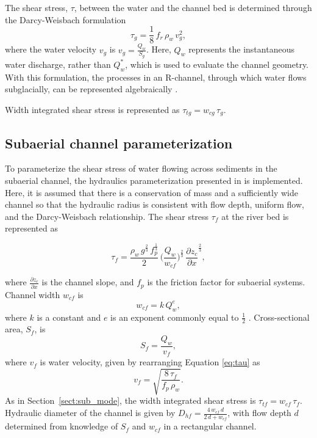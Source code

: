 \documentclass[draft]{agujournal2019}
\begin{document}
  The shear stress, $\tau$, between the water and the channel bed is determined through the Darcy-Weisbach formulation
  \begin{equation}
    \label{eq:tau}
    \tau_g=\frac{1}{8}\,f_r\,\rho_w\,v_g^2,
  \end{equation}
  where  the water velocity $v_g$ is $v_g = \frac{Q_w}{S_g}$.
  Here, $Q_w$ represents the instantaneous water discharge, rather than $Q_w^*$, which is used to evaluate the channel geometry.
  With this formulation, the processes in an R-channel, through which water flows subglacially, can be represented algebraically \cite{rothlisberger1972,delaney2019}.
  
    Width integrated shear stress is represented as $\tau_{tg}=w_{cg}\,\tau_g $.
  
  \subsection{Subaerial channel  parameterization}
  \label{sect:fluv}
  
  To parameterize the shear stress of water flowing across sediments in the subaerial channel,  the hydraulics parameterization presented in  is implemented.
  Here, it is assumed that there is a conservation of mass and a sufficiently wide channel so that the hydraulic radius is consistent with flow depth, uniform flow, and the Darcy-Weisbach relationship.
  The shear stress $\tau_f$ at the river bed is represented as
  \begin{linenomath*}
    \begin{equation}
      \label{eq:DW_tau}
      \tau_f=\frac{\rho_w\,g^{\frac{2}{3}}\,f_p^{\frac{1}{3}}}{2}\, \Big(\frac{Q_w}{w_{cf}} \Big)^{\frac{2}{3}} \,\frac{\partial z_c}{\partial x}^{\frac{2}{3}},
    \end{equation}
  \end{linenomath*}
  where $\frac{\partial z_c}{\partial x}$ is the channel slope, and $f_p$ is the friction factor for subaerial systems.
  Channel width $w_{cf}$ is 
  \begin{equation}
    \label{eq:wcf}
    w_{cf} = k \, Q_w^e,
  \end{equation}
  where $k$ is a constant and $e$ is an exponent commonly equal to $\frac{1}{2}$ \cite{leopold1953}.
  Cross-sectional area, $ S_f$, is 
  \begin{equation}
    \label{eq:Sf}
    S_f = \frac{Q_w}{v_f},
  \end{equation}
  where $v_f$ is water velocity, given by rearranging Equation \ref{eq:tau} as
  \begin{equation}
    \label{eq:vf}
    v_f = \sqrt{\frac{8\,\tau_f}{f_p\,\rho_w}}.
  \end{equation}
  As in Section~\ref{sect:sub_mode}, the width integrated shear stress is $\tau_{tf}=w_{cf}\,\tau_f$.
  Hydraulic diameter of the channel is given by $D_{hf} = \frac{4\,w_{cf}\,d}{2\,d+w_{cf}}$, with flow depth $d$ determined from knowledge of $S_f$ and $w_{cf}$ in a rectangular channel.
  
\end{document}
